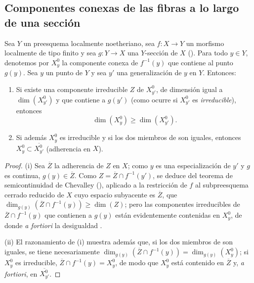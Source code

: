 \subsection{Componentes conexas de las fibras a lo largo de una sección}
\label{subsection:IV.15.6}

\begin{proposition}[15.6.1]
\label{IV.15.6.1}
Sea $Y$ un preesquema localmente noetheriano, sea $f:X\to Y$ un morfismo localmente de tipo finito y sea $g:Y\to X$ una $Y$-sección de $X$ \textup{()}.
Para todo $y\in Y$, denotemos por $X_y^0$ la componente conexa de $f^{-1}(y)$ que contiene al punto $g(y)$.
Sea $y$ un punto de $Y$ y sea $y'$ una generalización de $y$ en $Y$.
Entonces:
\begin{enumerate}[label=(\roman*)]
  \item Si existe una componente irreducible $Z$ de $X_{y'}^0$, de dimensión igual a $\dim(X_{y'}^0)$ y que contiene a $g(y')$ \textup{(como ocurre si $X_{y'}^0$ es \emph{irreducible})}, entonces
\begin{equation}
\tag{15.6.1.1}
\label{IV.15.6.1.1}
  \dim(X_y^0) \geq \dim(X_{y'}^0).
\end{equation}
  \item Si además $X_y^0$ es irreducible y si los dos miembros de  son iguales, entonces $X_y^0\subset\overline{X_{y'}^0}$ (adherencia en $X$).
\end{enumerate}
\end{proposition}

\begin{proof}
(i)
Sea $\overline{Z}$ la adherencia de $Z$ en $X$; como $y$ es una especialización de $y'$ y $g$ es continua, $g(y)\in\overline{Z}$.
Como $Z=\overline{Z}\cap f^{-1}(y')$, se deduce del teorema de semicontinuidad de Chevalley (), aplicado a la restricción de $f$ al subpreesquema cerrado reducido de $X$ cuyo espacio subyacente es $\overline{Z}$, que $\dim_{g(y)}(\overline{Z}\cap f^{-1}(y))\geq\dim(Z)$; pero las componentes irreducibles de $\overline{Z}\cap f^{-1}(y)$ que contienen a $g(y)$ están evidentemente contenidas en $X_y^0$, de donde \emph{a fortiori} la desigualdad .

(ii)
El razonamiento de (i) muestra además que, si los dos miembros de  son iguales, se tiene necesariamente $\dim_{g(y)}(\overline{Z}\cap f^{-1}(y))=\dim_{g(y)}(X_y^0)$; si $X_y^0$ es irreducible, $\overline{Z}\cap f^{-1}(y)=X_y^0$, de modo que $X_y^0$ está contenido en $\overline{Z}$ y, \emph{a fortiori}, en $\overline{X_{y'}^0}$.
\end{proof}

